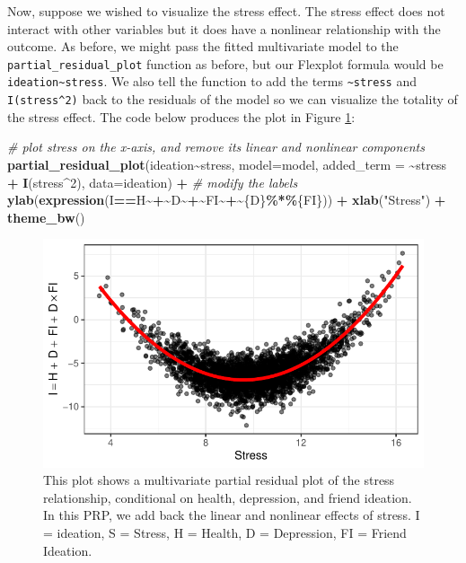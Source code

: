 \documentclass[
  man,floatsintext]{apa6}
\newenvironment{Shaded}{\begin{snugshade}}{\end{snugshade}}
\newcommand{\AttributeTok}[1]{\textcolor[rgb]{0.13,0.29,0.53}{#1}}
\newcommand{\CommentTok}[1]{\textcolor[rgb]{0.56,0.35,0.01}{\textit{#1}}}
\newcommand{\DecValTok}[1]{\textcolor[rgb]{0.00,0.00,0.81}{#1}}
\newcommand{\ErrorTok}[1]{\textcolor[rgb]{0.64,0.00,0.00}{\textbf{#1}}}
\newcommand{\FunctionTok}[1]{\textcolor[rgb]{0.13,0.29,0.53}{\textbf{#1}}}
\newcommand{\NormalTok}[1]{#1}
\newcommand{\SpecialCharTok}[1]{\textcolor[rgb]{0.81,0.36,0.00}{\textbf{#1}}}
\newcommand{\StringTok}[1]{\textcolor[rgb]{0.31,0.60,0.02}{#1}}
\begin{document}
Now, suppose we wished to visualize the stress effect. The stress effect does not interact with other variables but it does have a nonlinear relationship with the outcome. As before, we might pass the fitted multivariate model to the \texttt{partial\_residual\_plot} function as before, but our Flexplot formula would be \texttt{ideation\textasciitilde{}stress}. We also tell the function to add the terms \texttt{\textasciitilde{}stress} and \texttt{I(stress\^{}2)} back to the residuals of the model so we can visualize the totality of the stress effect. The code below produces the plot in Figure \ref{fig:prp2}:

\begin{Shaded}
\begin{Highlighting}[]
\CommentTok{\# plot stress on the x{-}axis, and remove it\textquotesingle{}s linear and nonlinear components}
\FunctionTok{partial\_residual\_plot}\NormalTok{(ideation}\SpecialCharTok{\textasciitilde{}}\NormalTok{stress, }
                      \AttributeTok{model=}\NormalTok{model, }
                      \AttributeTok{added\_term =} \SpecialCharTok{\textasciitilde{}}\NormalTok{stress }\SpecialCharTok{+} \FunctionTok{I}\NormalTok{(stress}\SpecialCharTok{\^{}}\DecValTok{2}\NormalTok{), }
                      \AttributeTok{data=}\NormalTok{ideation) }\SpecialCharTok{+}
  \CommentTok{\# modify the labels}
  \FunctionTok{ylab}\NormalTok{(}\FunctionTok{expression}\NormalTok{(I}\SpecialCharTok{==}\NormalTok{H}\SpecialCharTok{\textasciitilde{}+}\ErrorTok{\textasciitilde{}}\NormalTok{D}\SpecialCharTok{\textasciitilde{}+}\ErrorTok{\textasciitilde{}}\NormalTok{FI}\SpecialCharTok{\textasciitilde{}+}\ErrorTok{\textasciitilde{}}\NormalTok{\{D\}}\SpecialCharTok{\%*\%}\NormalTok{\{FI\})) }\SpecialCharTok{+} 
  \FunctionTok{xlab}\NormalTok{(}\StringTok{"Stress"}\NormalTok{) }\SpecialCharTok{+}
  \FunctionTok{theme\_bw}\NormalTok{()}
\end{Highlighting}
\end{Shaded}

\begin{figure}

{\centering \includegraphics[width=0.75\linewidth]{visual_partitions_files/figure-latex/prp2-1} 

}

\caption{This plot shows a multivariate partial residual plot of the stress relationship, conditional on health, depression, and friend ideation. In this PRP, we add back the linear and nonlinear effects of stress. I = ideation, S = Stress, H = Health, D = Depression, FI = Friend Ideation.}\label{fig:prp2}
\end{figure}
\end{document}
